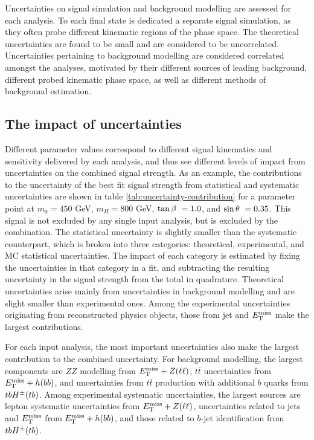 Uncertainties on signal simulation and background modelling are assessed for each analysis. To each final state is dedicated a separate signal simulation, as they often probe different kinematic regions of the phase space. The theoretical uncertainties are found to be small and are considered to be uncorrelated. Uncertainties pertaining to background modelling are considered correlated amongst the analyses, motivated by their different sources of leading background, different probed kinematic phase space, as well as different methods of background estimation.

\subsection{The impact of uncertainties}

Different \thdma parameter values correspond to different signal kinematics and sensitivity delivered by each analysis, and thus see different levels of impact from uncertainties on the combined signal strength. As an example, the contributions to the uncertainty of the best fit signal strength from statistical and systematic uncertainties are shown in table \ref{tab:uncertainty-contribution} for a parameter point at $m_a=450$ GeV, $m_H=800$ GeV, $\tan\beta~=1.0$, and $\sin\theta~=0.35$. This signal is not excluded by any single input analysis, but is excluded by the combination. The statistical uncertainty is slightly smaller than the systematic counterpart, which is broken into three categories: theoretical, experimental, and MC statistical uncertainties. The impact of each category is estimated by fixing the uncertainties in that category in a fit, and subtracting the resulting uncertainty in the signal strength from the total in quadrature. Theoretical uncertainties arise mainly from uncertainties in background modelling and are slight smaller than experimental ones. Among the experimental uncertainties originating from reconstructed physics objects, those from jet and $E_{\mathrm{T}}^{\mathrm{miss}}$ make the largest contributions. 

For each input analysis, the most important uncertainties also make the largest contribution to the combined uncertainty. For background modelling, the largest components are $ZZ$ modelling from $E_{\mathrm{T}}^{\mathrm{miss}}+Z(\ell\ell)$, $t\bar{t}$ uncertainties from $E_{\mathrm{T}}^{\mathrm{miss}}+h(bb)$, and uncertainties from $t\bar{t}$ production with additional $b$ quarks from $tbH^{\pm}(tb)$. Among experimental systematic uncertainties, the largest sources are lepton systematic uncertainties from $E_{\mathrm{T}}^{\mathrm{miss}}+Z(\ell\ell)$, uncertainties related to jets and $E_{\mathrm{T}}^{\mathrm{miss}}$ from $E_{\mathrm{T}}^{\mathrm{miss}}+h(bb)$, and those related to $b$-jet identification from $tbH^{\pm}(tb)$.

